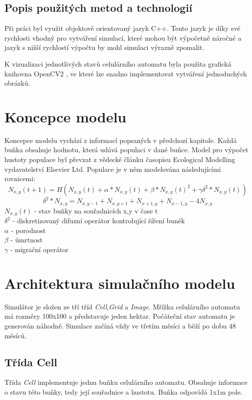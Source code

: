 \documentclass[a4paper,11pt]{article}
\begin{document}
\subsection{Popis použitých metod a technologií}
Při práci byl využit objektově orientovaný jazyk C++. Tento jazyk je díky své rychlosti vhodný pro vytváření simulací, které mohou být výpočetně náročné a jazyk s nižší rychlostí výpočtu by mohl simulaci výrazně zpomalit. 

K vizualizaci jednotlivých stavů celulárního automatu byla použita grafická knihovna OpenCV2 \cite{opencv2}, ve které lze snadno implementovat vytváření jednoduchých obrázků. 

\section{Koncepce modelu}
Koncepce modelu vychází z informací popsaných v předchozí kapitole. Každá buňka obsahuje hodnotu, která udává populaci v dané buňce. Model pro výpočet hustoty populace byl převzat z vědecké článku \cite{OurCA} časopisu Ecological Modelling vydavatelství Elsevier Ltd. Populace je v něm modelována následujícími rovnicemi:
\begin{equation}
N_{x,y}(t+1) = H(N_{x,y}(t) + \alpha*N_{x,y}(t) + \beta*N_{x,y}(t)^2 + \gamma\delta^2*N_{x,y}(t))
\end{equation}
\begin{equation}
\delta^2*N_{x,y} = N_{x,y-1} + N_{x,y+1} + N_{x+1,y} + N_{x-1,y} - 4N_{x,y}
\end{equation}
\( N_{x,y}(t) \) - stav buňky na souřadnicích x,y v čase t\ \\
\( \delta^2 \) - diskretizovaný difuzní operátor kontrolující šíření buněk \\
\( \alpha \) - porodnost \\
\( \beta \) - úmrtnost \\
\( \gamma \) - migrační operátor\\


\section{Architektura simulačního modelu}
Simulátor je složen ze tří tříd \emph{Cell},\emph{Grid} a \emph{Image}. Mřížka celulárního automatu má rozměry 100x100 a představuje jeden hektar. Počáteční stav automatu je generován náhodně. Simulace začíná vždy ve třetím měsíci a běží po dobu 48 měsíců.

\subsection{Třída Cell}
Třída \emph{Cell} implementuje jednu buňku celulárního automatu. Obsahuje informace o stavu této buňky, tedy její souřadnice a hustotu. Buňka odpovídá 1x1m pole.
\end{document}
